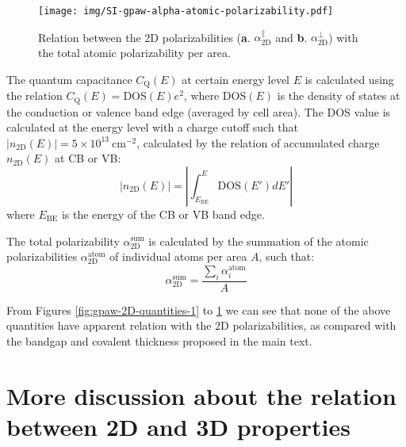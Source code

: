 \documentclass[journal=ancac3,email=true,hyperref=true,keywords=false]{achemso}
\begin{document}
\begin{figure}[htbp]
  \centering
  \texttt{[image: img/SI-gpaw-alpha-atomic-polarizability.pdf]}
  \caption{Relation between the 2D polarizabilities
    (\textbf{a}. $\alpha_{\mathrm{2D}}^{\parallel}$ and
    \textbf{b}. $\alpha_{\mathrm{2D}}^{\perp}$) with the total atomic polarizability per area.}
  \label{fig:gpaw-2D-quantities-3}
\end{figure}

The quantum capacitance
$C_{\mathrm{Q}}(E)$ at certain energy level $E$ is calculated using
the relation $C_{\mathrm{Q}}(E)=\mathrm{DOS}(E)e^{2}$, where
$\mathrm{DOS}(E)$ is the density of states at the conduction or valence band edge (averaged by cell
area). The DOS value is calculated at the energy level with a charge
cutoff such that
$|n_{\mathrm{2D}}(E)| = 5 \times 10^{13}\ \mathrm{cm}^{-2}$, calculated by
the relation of accumulated charge $n_{\mathrm{2D}}(E)$ at CB or VB:
\begin{equation}
  \label{eq:CQ-method}
  |n_{\mathrm{2D}}(E)| = \left|\int_{E_{\mathrm{BE}}}^{E} \mathrm{DOS}(E') dE' \right|
\end{equation}
where $E_{\mathrm{BE}}$ is the energy of the CB or VB band edge.

The total polarizability $\alpha_{\mathrm{2D}}^{\mathrm{sum}}$ is calculated by the
summation of the atomic polarizabilities $\alpha_{\mathrm{2D}}^{\mathrm{atom}}$
\cite{Gould_2016_jctc} of individual atoms per area $A$, such that:
\begin{equation}
  \label{eq:atom-polar}
  \alpha_{\mathrm{2D}}^{\mathrm{sum}} = \frac{\sum_{i} \alpha^{\mathrm{atom}}_{i}}{A}
\end{equation}

From Figures \ref{fig:gpaw-2D-quantities-1} to
\ref{fig:gpaw-2D-quantities-3} we can see that none of the above
quantities have apparent relation with the 2D polarizabilities, as
compared with the bandgap and covalent thickness proposed in the main
text. 

\section{More discussion about the relation between 2D and 3D properties}
\label{sec:2D-3D}
\end{document}

